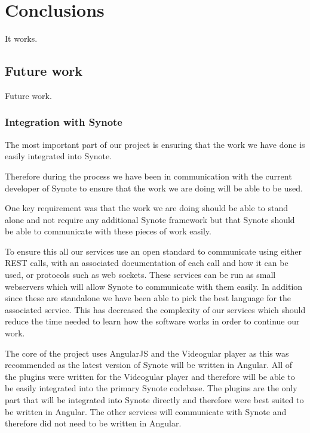 \chapter{Conclusions} \label{Chapter: Conclusions}
It works.

\section{Future work}

Future work.

\subsection{Integration with Synote}

The most important part of our project is ensuring that the work we have done is easily integrated into Synote.

Therefore during the process we have been in communication with the current developer of Synote to ensure that the work we are doing will be able to be used.

One key requirement was that the work we are doing should be able to stand alone and not require any additional Synote framework but that Synote should be able to communicate with these pieces of work easily.

To ensure this all our services use an open standard to communicate using either REST calls, with an associated documentation of each call and how it can be used, or protocols such as web sockets. These services can be run as small webservers which will allow Synote to communicate with them easily. In addition since these are standalone we have been able to pick the best language for the associated service. This has decreased the complexity of our services which should reduce the time needed to learn how the software works in order to continue our work.

The core of the project uses AngularJS and the Videogular player as this was recommended as the latest version of Synote will be written in Angular. All of the plugins were written for the Videogular player and therefore will be able to be easily integrated into the primary Synote codebase. The plugins are the only part that will be integrated into Synote directly and therefore were best suited to be written in Angular. The other services will communicate with Synote and therefore did not need to be written in Angular.

